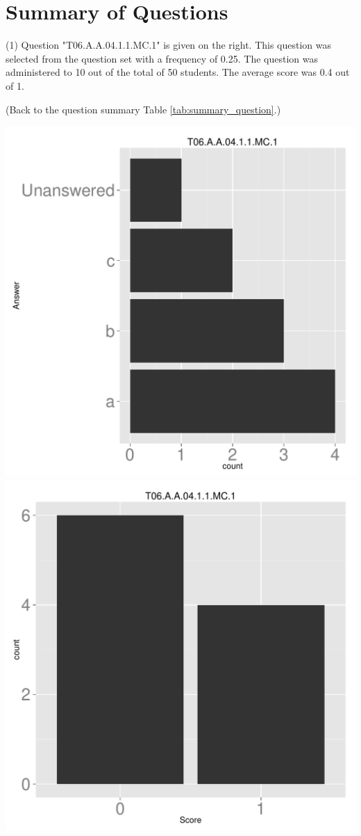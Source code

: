 \documentclass[12pt,english,nohyper]{tufte-handout}\usepackage[]{graphicx}\usepackage[]{color}
\begin{document}
\clearpage
\newpage{}
\section{Summary of Questions}


 (1) Question "T06.A.A.04.1.1.MC.1" is given on the right. This question was selected from the question set with a frequency of 0.25. The question was administered to 10 out of the total of 50 students. The average score was 0.4 out of 1.

 (Back to the question summary Table \ref{tab:summary_question}.)

\begin{center} \includegraphics[width=.45\linewidth]{Topic06_AB_1_answer} \includegraphics[width=.45\linewidth]{Topic06_AB_1_score} \end{center} 
\end{document}
